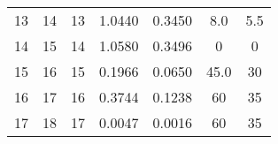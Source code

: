 \begin{table}
\begin{adjustbox}{width=0.95\textwidth,center=\textwidth}
\begin{tabular}{ccccccc}
13                                                        & 14                                                          & 13                                                  & 1.0440                                                                    & 0.3450                                                                    & 8.0                                                                         & 5.5                                                                              \\
14                                                        & 15                                                          & 14                                                  & 1.0580                                                                    & 0.3496                                                                    & 0                                                                           & 0                                                                                \\
15                                                        & 16                                                          & 15                                                  & 0.1966                                                                    & 0.0650                                                                    & 45.0                                                                        & 30                                                                               \\
16                                                        & 17                                                          & 16                                                  & 0.3744                                                                    & 0.1238                                                                    & 60                                                                          & 35                                                                               \\
17                                                        & 18                                                          & 17                                                  & 0.0047                                                                    & 0.0016                                                                    & 60                                                                          & 35                                                                               \\

\end{tabular}
\end{adjustbox}
\end{table}
